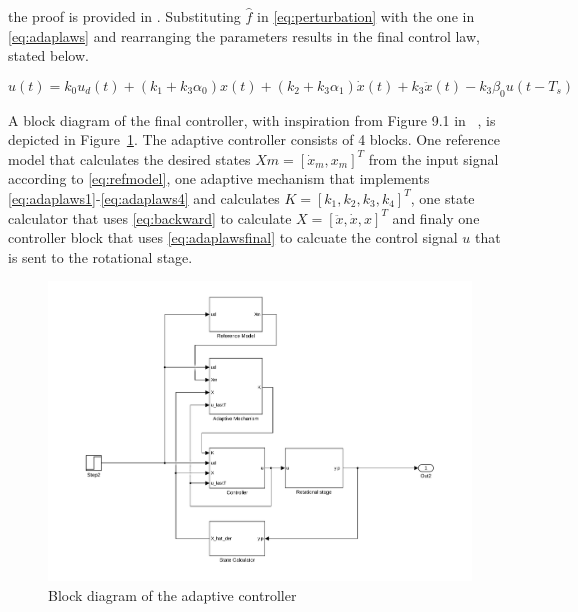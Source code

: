 the proof is provided in \citep{Qingson:2016}. Substituting $\hat{f}$ in \eqref{eq:perturbation} with the one in \eqref{eq:adaplaws} and rearranging the parameters results in the final \abbrMRACPE control law, stated below.

\begin{equation}
    \label{eq:adaplawsfinal}
  u(t) = k_0u_d(t) + (k_1 + k_3\alpha_0)x(t) +  (k_2 + k_3\alpha_1)\dot{x}(t) + k_3\ddot{x}(t) - k_3\beta_0u(t-T_s)
\end{equation}

A block diagram of the final controller, with inspiration from Figure 9.1 in ~\citep{Qingson:2016}, is depicted in Figure~\ref{fig:adaptive}. The adaptive controller consists of 4 blocks. One reference model that calculates the desired states $Xm=[\dot{x}_m, x_m]^T$ from the input signal according to \eqref{eq:refmodel}, one adaptive mechanism that implements \eqref{eq:adaplaws1}-\eqref{eq:adaplaws4} and calculates $K=[k_1, k_2, k_3, k_4]^T$, one state calculator that uses \eqref{eq:backward} to calculate $X=[\ddot{x}, \dot{x}, x]^T$ and finaly one controller block that uses \eqref{eq:adaplawsfinal} to calcuate the control signal $u$ that is sent to the rotational stage.

\begin{figure}[h]
  \centering %
  \includegraphics[width=1\textwidth, trim=4cm 0cm 3.8cm 0cm, clip=true]{fig/matlab/adaptive_scheme}
  \caption{\label{fig:adaptive}Block diagram of the adaptive controller}
\end{figure}

\newpage~\newpage~
\FloatBarrier
